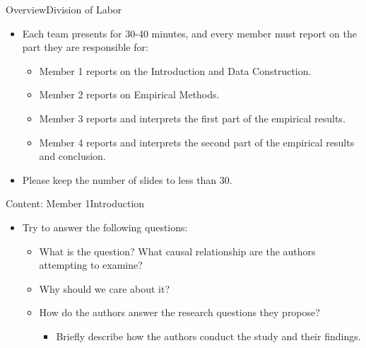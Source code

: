 \documentclass[hyperref={pdfpagelabels=false,hidelinks}]{beamer}
\begin{document}
\begin{frame}{Overview}{Division of Labor}
	\begin{itemize}
		\item Each team presents for 30-40 minutes, and every member must report on the part they are responsible for:
															\vspace{0.2cm}
		\begin{itemize}
			\item Member 1 reports on the Introduction and Data Construction.
																\vspace{0.2cm}
			\item Member 2 reports on Empirical Methods.
																\vspace{0.2cm}
			\item Member 3 reports and interprets the first part of the empirical results.
																\vspace{0.2cm}
			\item Member 4 reports and interprets the second part of the empirical results and conclusion.
																\vspace{0.2cm}
		\end{itemize}
		\item Please keep the number of slides to less than 30.
	\end{itemize}
\end{frame}

\begin{frame}{Content: Member 1}{Introduction}
	\begin{itemize}
		\item Try to answer the following questions:
															\vspace{0.2cm}
		\begin{itemize}
			\item What is the question? What causal relationship are the authors attempting to examine?
																\vspace{0.2cm}
			\item Why should we care about it?
																\vspace{0.2cm}
			\item How do the authors answer the research questions they propose?
			\begin{itemize}
																	\vspace{0.2cm}
				\item Briefly describe how the authors conduct the study and their findings.
			\end{itemize}
		\end{itemize}
	\end{itemize}
\end{frame}
\end{document}
